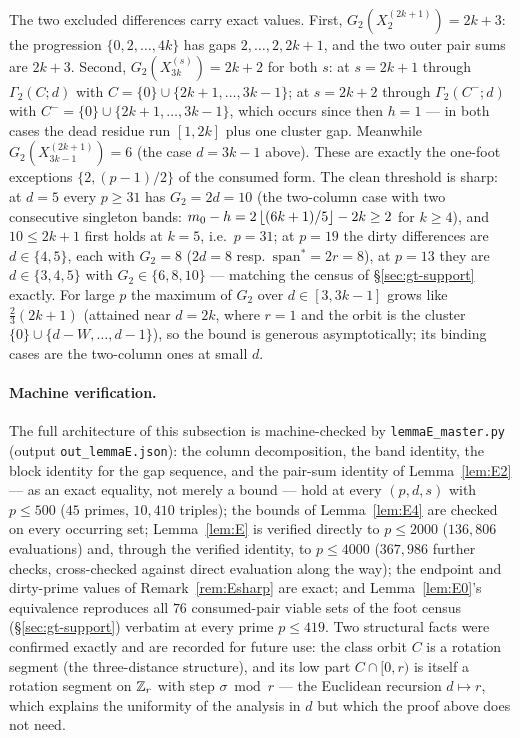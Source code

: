 \begin{remark}\label{rem:Esharp}
The two excluded differences carry exact values. First,
$G_2(X^{(2k+1)}_2)=2k{+}3$: the progression $\{0,2,\dots,4k\}$ has gaps
$2,\dots,2,2k{+}1$, and the two outer pair sums are $2k+3$. Second,
$G_2(X^{(s)}_{3k})=2k{+}2$ for both $s$: at $s=2k{+}1$ through
$\Gamma_2(C;d)$ with $C=\{0\}\cup\{2k{+}1,\dots,3k-1\}$; at
$s=2k{+}2$ through $\Gamma_2(C^-;d)$ with
$C^-=\{0\}\cup\{2k{+}1,\dots,3k-1\}$, which occurs since then $h=1$
--- in both cases the dead residue run $[1,2k]$ plus one cluster gap.
Meanwhile $G_2(X^{(2k+1)}_{3k-1})=6$ (the case $d=3k-1$ above). These
are exactly the one-foot exceptions $\{2,(p{-}1)/2\}$ of the consumed
form. The clean threshold is sharp: at $d=5$ every $p\ge31$ has
$G_2=2d=10$ (the two-column case with two consecutive singleton bands:
$m_0-h=2\left\lfloor (6k+1)/5 \right\rfloor-2k\ge2$ for $k\ge4$), and $10\le2k+1$ first
holds at $k=5$, i.e.\ $p=31$; at $p=19$ the dirty differences are
$d\in\{4,5\}$, each with $G_2=8$ ($2d=8$ resp.\
$\mathrm{span}^\ast=2r=8$), at $p=13$ they are $d\in\{3,4,5\}$ with
$G_2\in\{6,8,10\}$ --- matching the census of \S\ref{sec:gt-support}
exactly. For large $p$ the maximum of $G_2$ over $d\in[3,3k-1]$ grows
like $\tfrac23(2k+1)$ (attained near $d=2k$, where $r=1$ and the orbit
is the cluster $\{0\}\cup\{d-W,\dots,d-1\}$), so the bound is generous
asymptotically; its binding cases are the two-column ones at small
$d$.
\end{remark}

\paragraph{Machine verification.}
The full architecture of this subsection is machine-checked by
\texttt{lemmaE\_\allowbreak master.py} (output
\texttt{out\_\allowbreak lemmaE.json}): the
column decomposition, the band identity, the block identity for the gap
sequence, and the pair-sum identity of Lemma~\ref{lem:E2} --- as an
exact equality, not merely a bound --- hold at every $(p,d,s)$ with
$p\le500$ ($45$ primes, $10{,}410$ triples); the bounds of
Lemma~\ref{lem:E4} are checked on every occurring set;
Lemma~\ref{lem:E} is verified directly to $p\le2000$ ($136{,}806$
evaluations) and, through the verified identity, to $p\le4000$
($367{,}986$ further checks, cross-checked against direct evaluation
along the way); the endpoint and dirty-prime values of
Remark~\ref{rem:Esharp} are exact; and Lemma~\ref{lem:E0}'s equivalence
reproduces all $76$ consumed-pair viable sets of the foot census
(\S\ref{sec:gt-support}) verbatim at every prime $p\le419$. Two
structural facts were confirmed exactly and are recorded for future
use: the class orbit $C$ is a rotation segment (the three-distance
structure), and its low part $C\cap[0,r)$ is itself a rotation segment
on $\mathbb{Z}_r$ with step $\sigma\bmod r$ --- the Euclidean recursion
$d\mapsto r$, which explains the uniformity of the analysis in $d$ but
which the proof above does not need.

